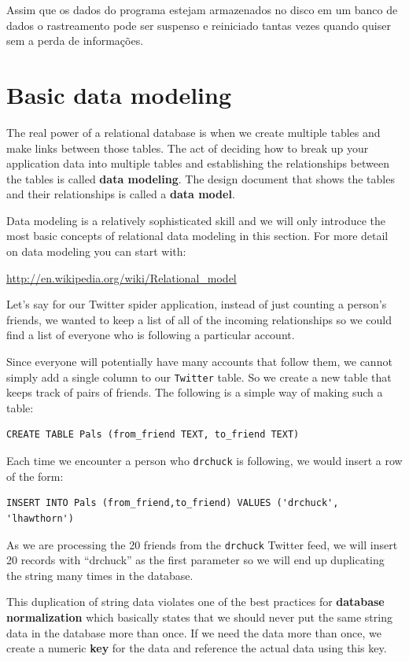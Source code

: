Assim que os dados do programa estejam armazenados no disco em um banco de
dados o rastreamento pode ser suspenso e reiniciado tantas vezes quando
quiser sem a perda de informações.

\section{Basic data modeling}

The real power of a relational database is when we create multiple tables
and make links between those tables.   The act of deciding how to break
up your application data into multiple tables and establishing the
relationships between the tables is called {\bf data modeling}.  The
design document that shows the tables and their relationships 
is called a {\bf data model}.

Data modeling is a relatively sophisticated skill and we will only introduce
the most basic concepts of relational data modeling in this section.  For more
detail on data modeling you can start with:

\url{http://en.wikipedia.org/wiki/Relational_model}

Let's say for our Twitter spider application, instead of just 
counting a person's friends, we wanted to keep a list of 
all of the incoming relationships so we could find a list of 
everyone who is following a particular account.

Since everyone will potentially have many accounts that follow
them, we cannot simply add a single column to our {\tt Twitter} table. 
So we create a new table that keeps track of pairs of friends.
The following is a simple way of making such a table:

\beforeverb
\begin{verbatim}
CREATE TABLE Pals (from_friend TEXT, to_friend TEXT)
\end{verbatim}
\afterverb
%
Each time we encounter a person who {\tt drchuck} is following, we
would insert a row of the form:

\beforeverb
\begin{verbatim}
INSERT INTO Pals (from_friend,to_friend) VALUES ('drchuck', 'lhawthorn')
\end{verbatim}
\afterverb
%
As we are processing the 20 friends from the {\tt drchuck}
Twitter feed, we will insert 20 records with ``drchuck''
as the first parameter so we will end up duplicating the 
string many times in the database.

This duplication of string data violates one of the best practices 
for {\bf database normalization} which basically states that
we should never put the same string data in the database more than once.  
If we need the data more than once, we create a 
numeric {\bf key} for the data and reference the actual data 
using this key.

